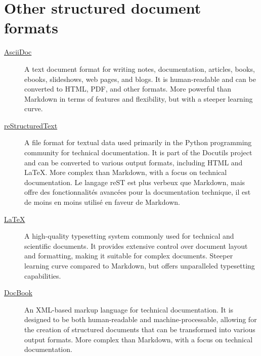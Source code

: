 \documentclass[a4paper,twoside]{article}
\begin{document}
\section{Other structured document formats}
\begin{description}
\item[{\href{https://asciidoc.org/}{AsciiDoc}}] A text document format for writing notes, documentation, articles, books, ebooks, slideshows, web pages, and blogs. It is human-readable and can be converted to HTML, PDF, and other formats. More powerful than Markdown in terms of features and flexibility, but with a steeper learning curve.
\item[{\href{https://docutils.sourceforge.io/rst.html}{reStructuredText}}] A file format for textual data used primarily in the Python programming community for technical documentation. It is part of the Docutils project and can be converted to various output formats, including HTML and \LaTeX{}. More complex than Markdown, with a focus on technical documentation. Le langage reST est plus verbeux que Markdown, mais offre des fonctionnalités avancées pour la documentation technique, il est de moins en moins utilisé en faveur de Markdown.
\item[{\href{https://www.latex-project.org/}{\LaTeX{}}}] A high-quality typesetting system commonly used for technical and scientific documents. It provides extensive control over document layout and formatting, making it suitable for complex documents. Steeper learning curve compared to Markdown, but offers unparalleled typesetting capabilities.
\item[{\href{https://docbook.org/}{DocBook}}] An XML-based markup language for technical documentation. It is designed to be both human-readable and machine-processable, allowing for the creation of structured documents that can be transformed into various output formats. More complex than Markdown, with a focus on technical documentation.
\end{description}
\end{document}
